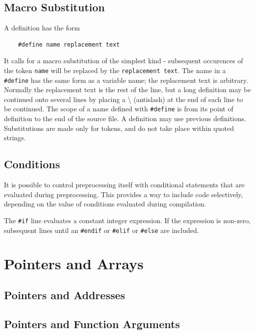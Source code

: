 \documentclass{scrartcl}
\begin{document}
        \subsection{Macro Substitution}
            A definition has the form
            \begin{lstlisting}
    #define name replacement text
            \end{lstlisting}
            It calls for a macro substitution of the simplest kind - subsequent
            occurences of the token \texttt{name} will be replaced by the
            \texttt{replacement text}. The name in a \texttt{\#define} has the
            same form as a variable name; the replacement text is arbitrary.
            Normally the replacement text is the rest of the line, but a long
            definition may be continued onto several lines by placing a \textbackslash
            (antislash) at the end of each line to be continued. The scope of a
            name defined with \texttt{\#define} is from its point of definition to
            the end of the source file. A definition may use previous definitions.
            Substitutions are made only for tokens, and do not take place within
            quoted strings.
        \subsection{Conditions}
            It is possible to control preprocessing itself with conditional
            statements that are evaluated during preprocessing. This provides
            a way to include code selectively, depending on the value of
            conditions evaluated during compilation.

            The \texttt{\#if} line evaluates a constant integer expression. If
            the expression is non-zero, subsequent lines until an \texttt{\#endif}
            or \texttt{\#elif} or \texttt{\#else} are included.

    \section{Pointers and Arrays}
        \subsection{Pointers and Addresses}
        \subsection{Pointers and Function Arguments}
\end{document}
